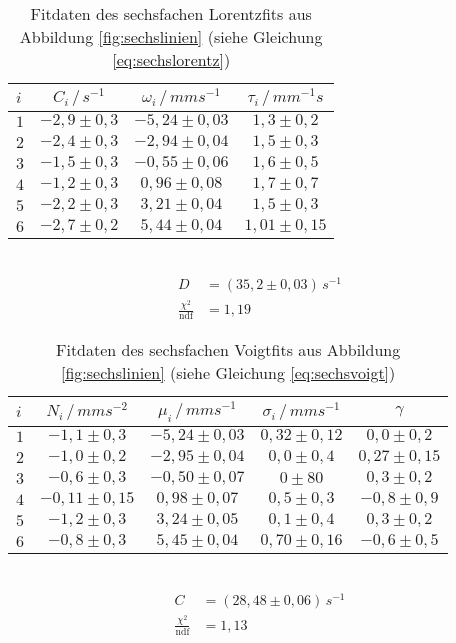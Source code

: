 \begin{table}[h!]
	\centering
	\begin{tabular}{l|ccc}
		$i$&$C_i\,/\,\si{s^{-1}}$&$\omega_i\,/\,\si{mms^{-1}}$&$\tau_i\,/\,\si{mm^{-1}s}$\\\hline
		$1$&$-2,9\pm0,3$&$-5,24\pm0,03$&$1,3\pm0,2$\\
		$2$&$-2,4\pm0,3$&$-2,94\pm0,04$&$1,5\pm0,3$\\
		$3$&$-1,5\pm0,3$&$-0,55\pm0,06$&$1,6\pm0,5$\\
		$4$&$-1,2\pm0,3$&$ 0,96\pm0,08$&$1,7\pm0,7$\\
		$5$&$-2,2\pm0,3$&$ 3,21\pm0,04$&$1,5\pm0,3$\\
		$6$&$-2,7\pm0,2$&$ 5,44\pm0,04$&$1,01\pm0,15$\\
	\end{tabular}\\
	\begin{align*}
	D&=(35,2\pm0,03)\,\si{s^{-1}}\\
	\frac{\chi^2}{\mathrm{ndf}}&=1,19
	\end{align*}
	\caption{Fitdaten des sechsfachen Lorentzfits aus Abbildung \ref{fig:sechslinien} (siehe Gleichung \ref{eq:sechslorentz})}
	\label{tab:sechslorentz}
\end{table}

\begin{table}[h!]
	\centering
	\begin{tabular}{l|cccc}
		$i$&$N_i\,/\,\si{mms^{-2}}$&$\mu_i\,/\,\si{mms^{-1}}$&$\sigma_i\,/\,\si{mms^{-1}}$&$\gamma$\\\hline
		$1$&$-1,1\pm0,3$&$-5,24\pm0,03$&$0,32\pm0,12$&$0,0\pm0,2$\\
		$2$&$-1,0\pm0,2$&$-2,95\pm0,04$&$0,0\pm0,4$&$0,27\pm0,15$\\
		$3$&$-0,6\pm0,3$&$-0,50\pm0,07$&$0\pm80$&$0,3\pm0,2$\\
		$4$&$-0,11\pm0,15$&$ 0,98\pm0,07$&$0,5\pm0,3$&$-0,8\pm0,9$\\
		$5$&$-1,2\pm0,3$&$ 3,24\pm0,05$&$0,1\pm0,4$&$0,3\pm0,2$\\
		$6$&$-0,8\pm0,3$&$ 5,45\pm0,04$&$0,70\pm0,16$&$-0,6\pm0,5$\\
	\end{tabular}\\
	\begin{align*}
		C&=(28,48\pm0,06)\,\si{s^{-1}}\\
		\frac{\chi^2}{\mathrm{ndf}}&=1,13
	\end{align*}
	\caption{Fitdaten des sechsfachen Voigtfits aus Abbildung \ref{fig:sechslinien} (siehe Gleichung \ref{eq:sechsvoigt})}
	\label{tab:sechsvoigt}
\end{table}